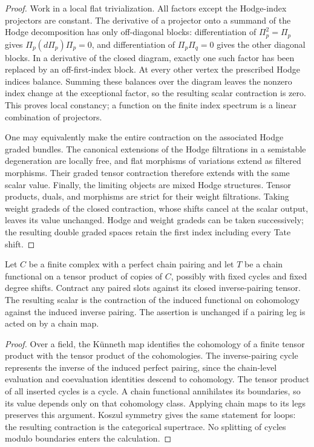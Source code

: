 \begin{proof}
Work in a local flat trivialization.  All factors except the Hodge-index
projectors are constant.  The derivative of a projector onto a summand of the
Hodge decomposition has only off-diagonal blocks: differentiation of
$\Pi_p^2=\Pi_p$ gives $\Pi_p(d\Pi_p)\Pi_p=0$, and differentiation of
$\Pi_p\Pi_q=0$ gives the other diagonal blocks.  In a derivative of the
closed diagram, exactly one such factor has been replaced by an
off-first-index block.  At every other vertex the prescribed Hodge indices
balance.  Summing these balances over the diagram leaves the nonzero index
change at the exceptional factor, so the resulting scalar contraction is
zero.  This proves local constancy; a function on the finite index spectrum
is a linear combination of projectors.

One may equivalently make the entire contraction on the associated Hodge
graded bundles.  The canonical extensions of the Hodge filtrations in a
semistable degeneration are locally free, and flat morphisms of variations
extend as filtered morphisms.  Their graded tensor contraction therefore
extends with the same scalar value.  Finally, the limiting objects are mixed
Hodge structures.  Tensor products, duals, and morphisms are strict for their
weight filtrations.  Taking weight gradeds of the closed contraction, whose
shifts cancel at the scalar output, leaves its value unchanged.  Hodge and
weight gradeds can be taken successively; the resulting double graded spaces
retain the first index including every Tate shift.
\end{proof}

\begin{lemma}\label{fp:chain-contraction}
Let $C$ be a finite complex with a perfect chain pairing and let $T$ be a
chain functional on a tensor product of copies of $C$, possibly with fixed
cycles and fixed degree shifts.  Contract any paired slots against its closed
inverse-pairing tensor.  The resulting scalar is the contraction of the
induced functional on cohomology against the induced inverse pairing.
The assertion is unchanged if a pairing leg is acted on by a chain map.
\end{lemma}

\begin{proof}
Over a field, the K\"unneth map identifies the cohomology of a finite tensor
product with the tensor product of the cohomologies.  The inverse-pairing
cycle represents the inverse of the induced perfect pairing, since the
chain-level evaluation and coevaluation identities descend to cohomology.
The tensor product of all inserted cycles is a cycle.  A chain functional
annihilates its boundaries, so its value depends only on that cohomology
class.  Applying chain maps to its legs preserves this argument.  Koszul
symmetry gives the same statement for loops: the resulting contraction is
the categorical supertrace.  No splitting of cycles modulo boundaries enters
the calculation.
\end{proof}

